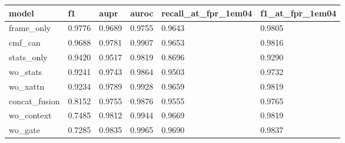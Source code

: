 \begin{tabular}{llllll}
\toprule
model & f1 & aupr & auroc & recall\_at\_fpr\_1em04 & f1\_at\_fpr\_1em04 \\
\midrule
frame\_only & 0.9776 & 0.9689 & 0.9755 & 0.9643 & 0.9805 \\
cmf\_can & 0.9688 & 0.9781 & 0.9907 & 0.9653 & 0.9816 \\
stats\_only & 0.9420 & 0.9517 & 0.9819 & 0.8696 & 0.9290 \\
wo\_stats & 0.9241 & 0.9743 & 0.9864 & 0.9503 & 0.9732 \\
wo\_xattn & 0.9234 & 0.9789 & 0.9928 & 0.9659 & 0.9819 \\
concat\_fusion & 0.8152 & 0.9755 & 0.9876 & 0.9555 & 0.9765 \\
wo\_context & 0.7485 & 0.9812 & 0.9944 & 0.9669 & 0.9819 \\
wo\_gate & 0.7285 & 0.9835 & 0.9965 & 0.9690 & 0.9837 \\
\bottomrule
\end{tabular}
